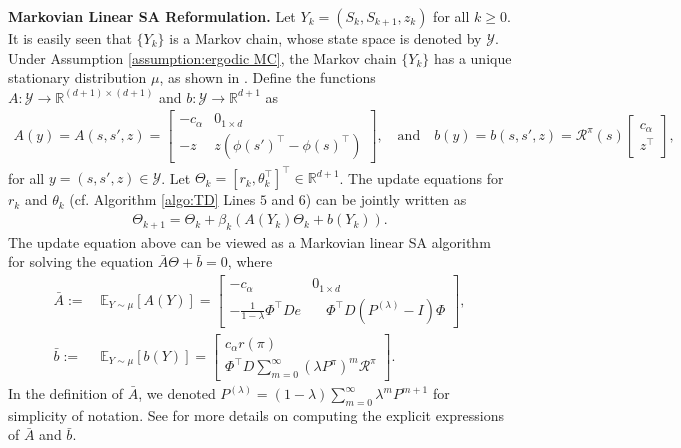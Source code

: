 \documentclass[11 pt]{article}
\begin{document}
	\vspace{3 mm}
	\noindent\textbf{Markovian Linear SA Reformulation.}
	Let $Y_k = (S_k, S_{k+1}, z_k)$ for all $k \geq 0$. It is easily seen that $\{Y_k\}$ is a Markov chain, whose state space is denoted by $\mathcal{Y}$. Under Assumption \ref{assumption:ergodic MC}, the Markov chain $\{Y_k\}$ has a unique stationary distribution $\mu$, as shown in \cite[Section 6.3.3]{bertsekas1996neuro}. Define the functions $A:\mathcal{Y} \to\mathbb{R}^{(d+1)\times (d+1)}$ and $b:\mathcal{Y}\to\mathbb{R}^{d+1}$ as 
	\begin{align*}
		A(y) = A(s, s', z) = \begin{bmatrix}
			-c_\alpha & 0_{1\times d} \\
			-z & z \left(\phi(s')^\top - \phi(s)^\top \right)
		\end{bmatrix}, \quad \text{and}\quad 
		b(y) = b(s, s', z) = \mathcal{R}^\pi(s)\begin{bmatrix}c_\alpha \\
			z^\top\end{bmatrix},
	\end{align*}
	for all $y = (s, s', z) \in \mathcal{Y}$. Let $\Theta_k = [r_k ,
	\theta_k^\top]^\top \in \mathbb{R}^{d+1}$. The update equations for $r_k$ and $\theta_k$ (cf. Algorithm \ref{algo:TD} Lines $5$ and $6$) can be jointly written as
	\begin{align}\label{TD(lambda) matrix form}
		\Theta_{k+1} = \Theta_k + \beta_k\left(A(Y_k) \Theta_k + b(Y_k)\right).
	\end{align}
	The update equation above can be viewed as a Markovian linear SA algorithm for solving the equation $\bar{A}\Theta + \bar{b} = 0$, where
	\begin{align*}
		\bar{A}:=\,&\mathbb{E}_{Y\sim \mu} [A(Y)]= \begin{bmatrix}
			-c_\alpha & 0_{1 \times d}\\
			-\frac{1}{1-\lambda}\Phi^\top D e &\quad  \Phi^\top D \left(P^{(\lambda)}- I \right)\Phi
		\end{bmatrix},\\
		\bar{b}:=\,&\mathbb{E}_{Y\sim \mu} [b(Y)]=\begin{bmatrix}
			c_\alpha r(\pi)\\
			\Phi^\top D\sum_{m=0}^\infty(\lambda P^\pi)^m\mathcal{R}^\pi
		\end{bmatrix}.
	\end{align*}
	In the definition of $\bar{A}$, we denoted $P^{(\lambda)}=(1-\lambda)\sum_{m=0}^\infty\lambda^mP^{m+1}$ for simplicity of notation.
	See \cite{tsitsiklis1999average} for more details on computing the explicit expressions of $\bar{A}$ and $\bar{b}$.
	
\end{document}
